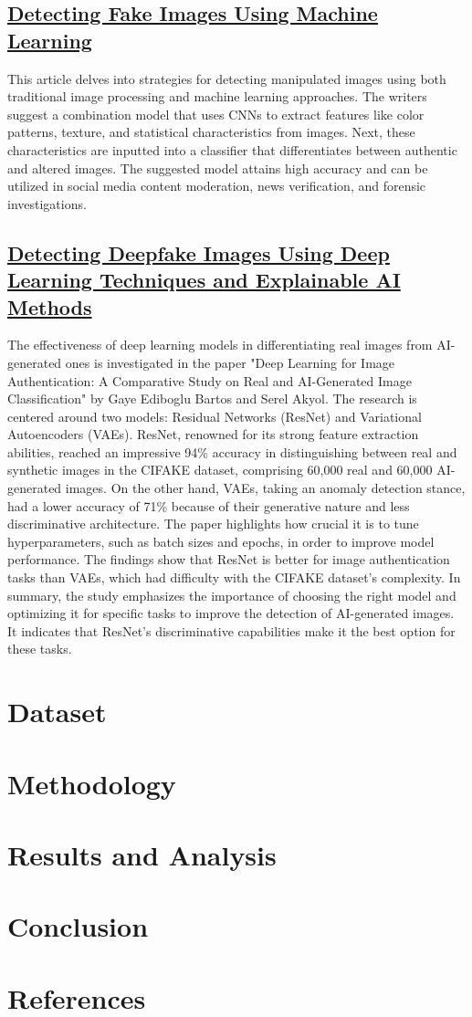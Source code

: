 \documentclass[10pt,twocolumn,letterpaper]{article}
\begin{document}
\subsection{\href{https://ijrpr.com/uploads/V4ISSUE4/IJRPR11629.pdf}{Detecting Fake Images Using Machine Learning}}
This article delves into strategies for detecting manipulated images using both traditional image processing and machine learning approaches. The writers suggest a combination model that uses CNNs to extract features like color patterns, texture, and statistical characteristics from images. Next, these characteristics are inputted into a classifier that differentiates between authentic and altered images. The suggested model attains high accuracy and can be utilized in social media content moderation, news verification, and forensic investigations.

\subsection{\href{https://www.techscience.com/iasc/v35n2/48928/html}{Detecting Deepfake Images Using Deep Learning Techniques and Explainable AI Methods}}
The effectiveness of deep learning models in differentiating real images from AI-generated ones is investigated in the paper "Deep Learning for Image Authentication: A Comparative Study on Real and AI-Generated Image Classification" by Gaye Ediboglu Bartos and Serel Akyol. The research is centered around two models: Residual Networks (ResNet) and Variational Autoencoders (VAEs). ResNet, renowned for its strong feature extraction abilities, reached an impressive 94\% accuracy in distinguishing between real and synthetic images in the CIFAKE dataset, comprising 60,000 real and 60,000 AI-generated images. On the other hand, VAEs, taking an anomaly detection stance, had a lower accuracy of 71\% because of their generative nature and less discriminative architecture. The paper highlights how crucial it is to tune hyperparameters, such as batch sizes and epochs, in order to improve model performance. The findings show that ResNet is better for image authentication tasks than VAEs, which had difficulty with the CIFAKE dataset's complexity. In summary, the study emphasizes the importance of choosing the right model and optimizing it for specific tasks to improve the detection of AI-generated images. It indicates that ResNet's discriminative capabilities make it the best option for these tasks.

\section{Dataset}
\section{Methodology}
\section{Results and Analysis}
\section{Conclusion}
\section{References}
\end{document}
